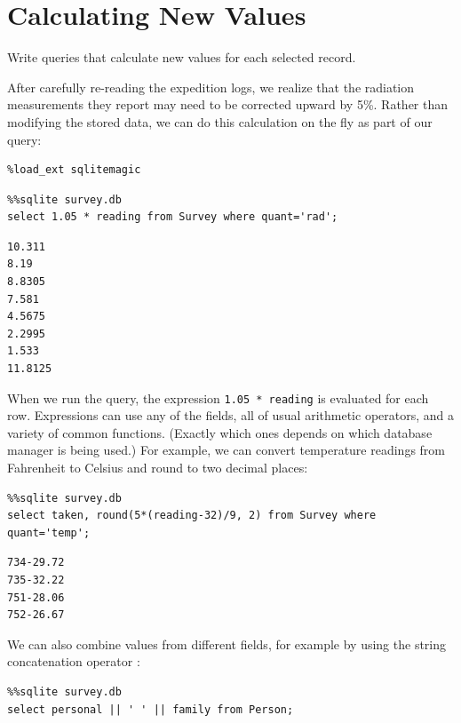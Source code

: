\documentclass{book}
\begin{document}
\section{Calculating New Values}

\begin{objectives}
\begin{swcitemize}
\item
  Write queries that calculate new values for each selected record.
\end{swcitemize}
\end{objectives}

After carefully re-reading the expedition logs, we realize that the
radiation measurements they report may need to be corrected upward by
5\%. Rather than modifying the stored data, we can do this calculation
on the fly as part of our query:

\begin{verbatim}
%load_ext sqlitemagic
\end{verbatim}

\begin{verbatim}
%%sqlite survey.db
select 1.05 * reading from Survey where quant='rad';
\end{verbatim}

\begin{verbatim}
10.311
8.19
8.8305
7.581
4.5675
2.2995
1.533
11.8125
\end{verbatim}

When we run the query, the expression \texttt{1.05 * reading} is
evaluated for each row. Expressions can use any of the fields, all of
usual arithmetic operators, and a variety of common functions. (Exactly
which ones depends on which database manager is being used.) For
example, we can convert temperature readings from Fahrenheit to Celsius
and round to two decimal places:

\begin{verbatim}
%%sqlite survey.db
select taken, round(5*(reading-32)/9, 2) from Survey where quant='temp';
\end{verbatim}

\begin{verbatim}
734-29.72
735-32.22
751-28.06
752-26.67
\end{verbatim}

We can also combine values from different fields, for example by using
the string concatenation operator \texttt{\textbar{}\textbar{}}:

\begin{verbatim}
%%sqlite survey.db
select personal || ' ' || family from Person;
\end{verbatim}
\end{document}
